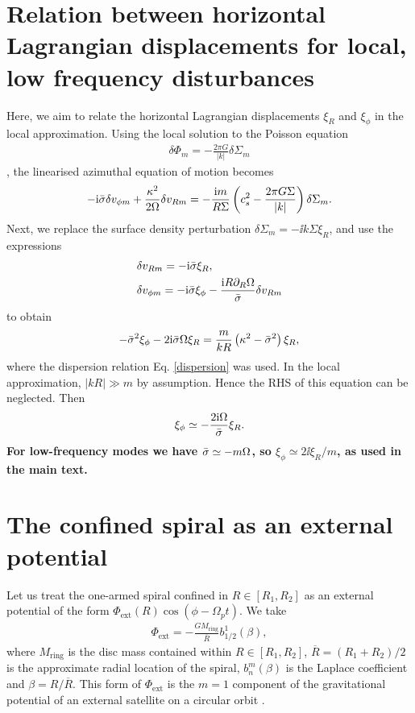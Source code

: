\section{Relation between horizontal Lagrangian displacements for
  local, low frequency disturbances}\label{horizontal_displacements}
Here, we aim to relate the horizontal Lagrangian displacements $\xi_R$
and $\xi_\phi$ in the local approximation. Using the local solution to
the Poisson equation 
\begin{align}
  \delta \Phi_m = -\frac{2\pi G}{|k|} \delta\Sigma_m 
\end{align}
\citep{shu91}, the linearised azimuthal equation of motion becomes 
\begin{align} 
  - \mathrm{i}\bar{\sigma} \delta v_{\phi m}  + \frac{\kappa^2}{2\Omega}\delta v_{Rm} = -\frac{\mathrm{i}
    m}{R\Sigma}\left(c_s^2 - \frac{2\pi G
      \Sigma}{|k|}\right)\delta\Sigma_m. 
\end{align}
Next, we replace the surface density perturbation
$\delta \Sigma_m = -\ii k \Sigma \xi_R$, and use the expressions
\begin{align}
  &\delta v_{Rm} = -\mathrm{i}\bar{\sigma}\xi_R,\\
  &\delta v_{\phi m} = -\mathrm{i}\bar{\sigma}\xi_\phi - \frac{\mathrm{i} R
    \partial_R\Omega}{\bar{\sigma}} \delta v_{Rm}
\end{align}
\citep{papaloizou85} to obtain 
\begin{align}
  -\bar{\sigma}^2\xi_\phi - 2\mathrm{i}\bar{\sigma}\Omega \xi_R =
  \frac{m}{kR}\left(\kappa^2 - \bar{\sigma}^2\right)\xi_R, 
\end{align}
where the dispersion relation Eq. \ref{dispersion} was used. 
In the local approximation, $|kR|\gg m$ by assumption. %
 Hence the RHS of this equation can be neglected. Then 
\begin{align}
  \xi_\phi \simeq -\frac{2\mathrm{i}\Omega}{\bar{\sigma}}\xi_R.
\end{align}
{\bf 
For low-frequency modes we have $\bar{\sigma} \simeq -m\Omega$, so
$\xi_\phi\simeq 2\ii\xi_R/m$, as used in the main text.  
}




\section{The confined spiral as an external potential}\label{disc-planet}
Let us treat the one-armed spiral confined in $R\in[R_1,R_2]$ as an  
external potential of the form $\Phi_\mathrm{ext}(R)\cos{\left(\phi -
    \Omega_pt\right)}$. We take 
\begin{align} 
  \Phi_\mathrm{ext}
  =-\frac{GM_\mathrm{ring}}{\overline{R}}b^{1}_{1/2}(\beta),   
\end{align}
where $M_\mathrm{ring}$ is the disc mass contained within
$R\in[R_1,R_2]$, $\overline{R} = (R_1+R_2)/2$ is the approximate radial
location of the spiral, $b_{n}^m(\beta)$ is the Laplace coefficient
and $\beta = R/\overline{R}$. This form of
$\Phi_\mathrm{ext}$ is the $m=1$ component of the gravitational
potential of an external satellite on a circular orbit
\citep{goldreich79}.    

